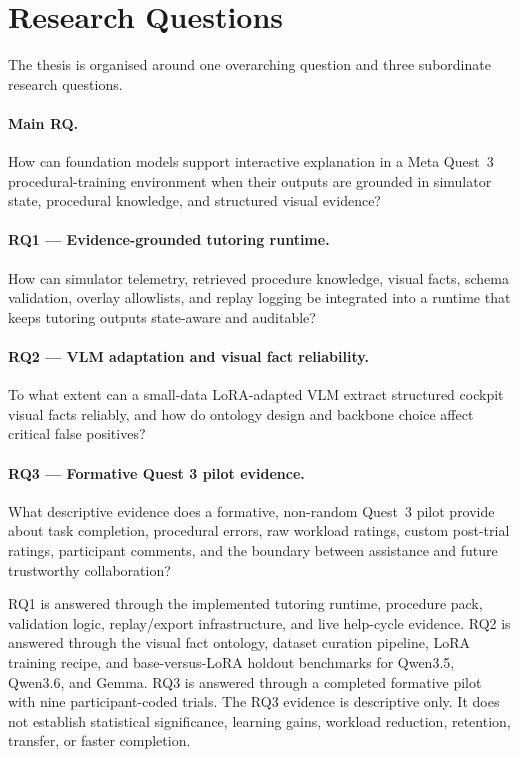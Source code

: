 \section{Research Questions}\label{sec:intro-rq}

The thesis is organised around one overarching question and three subordinate
research questions.

\paragraph{Main RQ.}
How can foundation models support interactive explanation in a Meta Quest~3
procedural-training environment when their outputs are grounded in simulator
state, procedural knowledge, and structured visual evidence?

\paragraph{RQ1 --- Evidence-grounded tutoring runtime.}
How can simulator telemetry, retrieved procedure knowledge, visual facts,
schema validation, overlay allowlists, and replay logging be integrated into a
runtime that keeps tutoring outputs state-aware and auditable?

\paragraph{RQ2 --- VLM adaptation and visual fact reliability.}
To what extent can a small-data LoRA-adapted VLM extract structured cockpit
visual facts reliably, and how do ontology design and backbone choice affect
critical false positives?

\paragraph{RQ3 --- Formative Quest 3 pilot evidence.}
What descriptive evidence does a formative, non-random Quest~3 pilot provide
about task completion, procedural errors, raw workload ratings, custom
post-trial ratings, participant comments, and the boundary between assistance
and future trustworthy collaboration?

RQ1 is answered through the implemented tutoring runtime, procedure pack,
validation logic, replay/export infrastructure, and live help-cycle evidence.
RQ2 is answered through the visual fact ontology, dataset curation pipeline,
LoRA training recipe, and base-versus-LoRA holdout benchmarks for Qwen3.5,
Qwen3.6, and Gemma. RQ3 is answered through a completed formative pilot with
nine participant-coded trials. The RQ3 evidence is descriptive only. It does
not establish statistical significance, learning gains, workload reduction,
retention, transfer, or faster completion.

